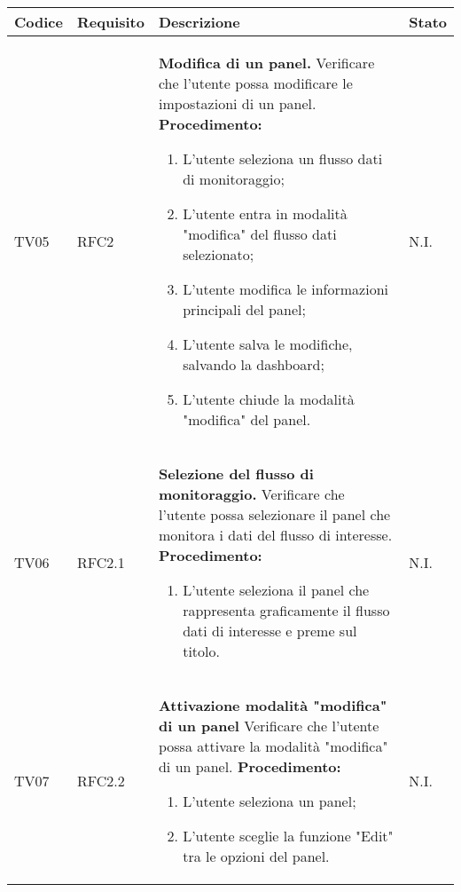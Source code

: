 \begin{table}[!htpb]
	\centering
	\renewcommand{\arraystretch}{2} 
	\begin{tabular}{|l|l|p{10cm}|l|}
		\rowcolor{orange!50}
		\hline
		\textbf{Codice} & \textbf{Requisito}& \textbf{Descrizione} & \textbf{Stato}\\ 
		\hline
		TV05 & RFC2 	& 
			\textbf{Modifica di un panel.} 
			\newline 
			Verificare che l’utente possa modificare le impostazioni di un panel. 
			\newline 
			\textbf{Procedimento:} 
			\begin{enumerate} 
				\item L’utente seleziona un flusso dati di monitoraggio; 
				\item L’utente entra in modalità "modifica" del flusso dati selezionato; 
				\item L’utente modifica le informazioni principali del panel; 
				\item L'utente salva le modifiche, salvando la dashboard; 
				\item L’utente chiude la modalità "modifica" del panel. 
			\end{enumerate} 
			& N.I.\\
		\hline
		TV06 & RFC2.1 	&
			\textbf{Selezione del flusso di monitoraggio.}
			\newline 
			Verificare che l'utente possa selezionare il panel che monitora i dati del flusso di interesse.
			\newline
			\textbf{Procedimento:}
			\begin{enumerate}
				\item L’utente seleziona il panel che rappresenta graficamente il flusso dati di interesse e preme sul titolo.
			\end{enumerate} 
			& N.I.\\
		\hline
		TV07 & RFC2.2 	&
			\textbf{Attivazione modalità "modifica" di un panel}
			\newline 
			Verificare che l'utente possa attivare la modalità "modifica" di un panel.
			\newline
			\textbf{Procedimento:}
			\begin{enumerate}
				\item L'utente seleziona un panel;
				\item L’utente sceglie la funzione "Edit" tra le opzioni del panel.
			\end{enumerate} 
			& N.I.\\
		\hline
	\end{tabular}
\end{table}
